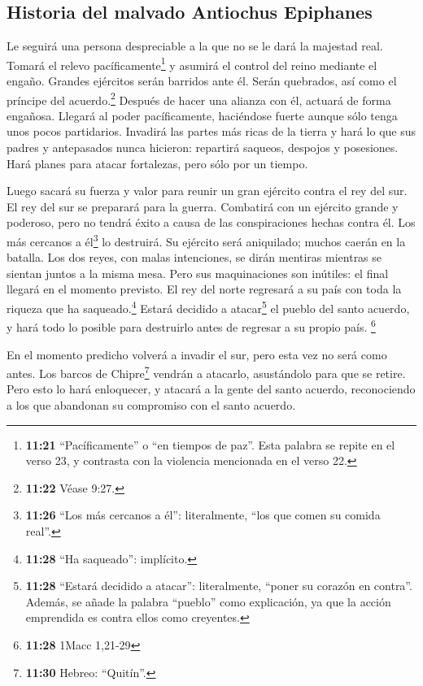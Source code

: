 \hypertarget{historia-del-malvado-antiochus-epiphanes}{%
\subsection{Historia del malvado Antiochus
Epiphanes}\label{historia-del-malvado-antiochus-epiphanes}}

 Le seguirá una persona despreciable a la que no se le
dará la majestad real. Tomará el relevo pacíficamente\footnote{\textbf{11:21}
  ``Pacíficamente'' o ``en tiempos de paz''. Esta palabra se repite en
  el verso 23, y contrasta con la violencia mencionada en el verso 22.}
y asumirá el control del reino mediante el engaño. 
Grandes ejércitos serán barridos ante él. Serán quebrados, así como el
príncipe del acuerdo.\footnote{\textbf{11:22} Véase 9:27.}
 Después de hacer una alianza con él, actuará de forma
engañosa. Llegará al poder pacíficamente, haciéndose fuerte aunque sólo
tenga unos pocos partidarios.  Invadirá las partes más
ricas de la tierra y hará lo que sus padres y antepasados nunca
hicieron: repartirá saqueos, despojos y posesiones. Hará planes para
atacar fortalezas, pero sólo por un tiempo.

 Luego sacará su fuerza y valor para reunir un gran
ejército contra el rey del sur. El rey del sur se preparará para la
guerra. Combatirá con un ejército grande y poderoso, pero no tendrá
éxito a causa de las conspiraciones hechas contra él. 
Los más cercanos a él\footnote{\textbf{11:26} ``Los más cercanos a él'':
  literalmente, ``los que comen su comida real''.} lo destruirá. Su
ejército será aniquilado; muchos caerán en la batalla. 
Los dos reyes, con malas intenciones, se dirán mentiras mientras se
sientan juntos a la misma mesa. Pero sus maquinaciones son inútiles: el
final llegará en el momento previsto.  El rey del norte
regresará a su país con toda la riqueza que ha saqueado.\footnote{\textbf{11:28}
  ``Ha saqueado'': implícito.} Estará decidido a atacar\footnote{\textbf{11:28}
  ``Estará decidido a atacar'': literalmente, ``poner su corazón en
  contra''. Además, se añade la palabra ``pueblo'' como explicación, ya
  que la acción emprendida es contra ellos como creyentes.} el pueblo
del santo acuerdo, y hará todo lo posible para destruirlo antes de
regresar a su propio país. \footnote{\textbf{11:28} 1Macc 1,21-29}

 En el momento predicho volverá a invadir el sur, pero
esta vez no será como antes.  Los barcos de
Chipre\footnote{\textbf{11:30} Hebreo: ``Quitín''.} vendrán a atacarlo,
asustándolo para que se retire. Pero esto lo hará enloquecer, y atacará
a la gente del santo acuerdo, reconociendo a los que abandonan su
compromiso con el santo acuerdo.

